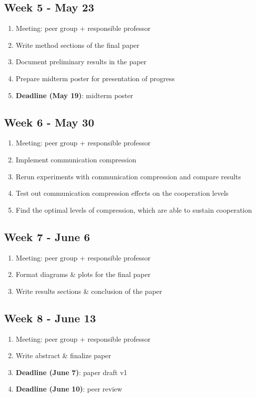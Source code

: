 \documentclass[english]{article}
\begin{document}
\subsection*{Week 5 - May 23}
\begin{enumerate}
\item Meeting: peer group + responsible professor
\item Write method sections of the final paper
\item Document preliminary results in the paper
\item Prepare midterm poster for presentation of progress
\item \textbf{Deadline (May 19)}: midterm poster
\end{enumerate}

\subsection*{Week 6 - May 30}
\begin{enumerate}
\item Meeting: peer group + responsible professor
\item Implement communication compression
\item Rerun experiments with communication compression and compare results
\item Test out communication compression effects on the cooperation levels
\item Find the optimal levels of compression, which are able to sustain cooperation
\end{enumerate}

\subsection*{Week 7 - June 6}
\begin{enumerate}
\item Meeting: peer group + responsible professor
\item Format diagrams \& plots for the final paper
\item Write results sections \& conclusion of the paper
\end{enumerate}

\subsection*{Week 8 - June 13}
\begin{enumerate}
\item Meeting: peer group + responsible professor
\item Write abstract \& finalize paper
\item \textbf{Deadline (June 7)}: paper draft v1
\item \textbf{Deadline (June 10)}: peer review
\end{enumerate}
\end{document}
